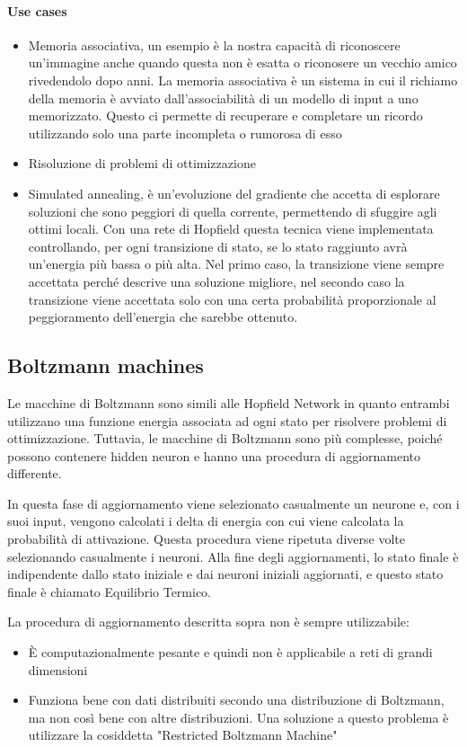 \paragraph{Use cases}
\begin{itemize}
    \item Memoria associativa, un esempio è la nostra capacità di riconoscere un'immagine anche quando questa non è esatta o riconosere un vecchio amico rivedendolo dopo anni. La memoria associativa è un sistema in cui il richiamo della memoria è avviato dall'associabilità di un modello di input a uno memorizzato. Questo ci permette di recuperare e completare un ricordo utilizzando solo una parte incompleta o rumorosa di esso
    \item Risoluzione di problemi di ottimizzazione
    \item Simulated annealing, è un'evoluzione del gradiente che accetta di esplorare soluzioni che sono peggiori di quella corrente, permettendo di sfuggire agli ottimi locali. Con una rete di Hopfield questa tecnica viene implementata controllando, per ogni transizione di stato, se lo stato raggiunto avrà un'energia più bassa o più alta. Nel primo caso, la transizione viene sempre accettata perché descrive una soluzione migliore, nel secondo caso la transizione viene accettata solo con una certa probabilità proporzionale al peggioramento dell'energia che sarebbe ottenuto.
\end{itemize}

\subsection{Boltzmann machines}
Le macchine di Boltzmann sono simili alle Hopfield Network in quanto entrambi utilizzano una funzione energia associata ad ogni stato per risolvere problemi di ottimizzazione. Tuttavia, le macchine di Boltzmann sono più complesse, poiché possono contenere hidden neuron e hanno una procedura di aggiornamento differente. 

In questa fase di aggiornamento viene selezionato casualmente un neurone e, con i suoi input, vengono calcolati i delta di energia con cui viene calcolata la probabilità di attivazione. Questa procedura viene ripetuta diverse volte selezionando casualmente i neuroni. Alla fine degli aggiornamenti, lo stato finale è indipendente dallo stato iniziale e dai neuroni iniziali aggiornati, e questo stato finale è chiamato Equilibrio Termico.

La procedura di aggiornamento descritta sopra non è sempre utilizzabile:
\begin{itemize}
    \item È computazionalmente pesante e quindi non è applicabile a reti di grandi dimensioni
    \item Funziona bene con dati distribuiti secondo una distribuzione di Boltzmann, ma non così bene con altre distribuzioni. Una soluzione a questo problema è utilizzare la cosiddetta "Restricted Boltzmann Machine" 
\end{itemize}

